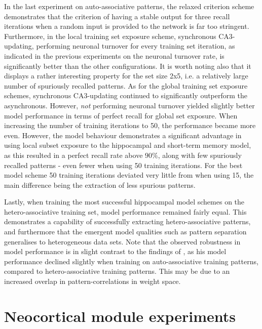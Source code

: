 In the last experiment on auto-associative patterns, the relaxed criterion scheme demonstrates that the criterion of having a stable output for three recall iterations when a random input is provided to the network is far too stringent. Furthermore, in the local training set exposure scheme, synchronous CA3-updating, performing neuronal turnover for every training set iteration, as indicated in the previous experiments on the neuronal turnover rate, is significantly better than the other configurations. It is worth noting also that it displays a rather interesting property for the set size 2x5, i.e. a relatively large number of spuriously recalled patterns. As for the global training set exposure schemes, synchronous CA3-updating continued to significantly outperform the asynchronous. However, \textit{not} performing neuronal turnover yielded slightly better model performance in terms of perfect recall for global set exposure. When increasing the number of training iterations to 50, the performance became more even. However, the model behaviour demonstrates a significant advantage in using local subset exposure to the hippocampal and short-term memory model, as this resulted in a perfect recall rate above $90 \%$, along with few spuriously recalled patterns - even fewer when using 50 training iterations. For the best model scheme 50 training iterations deviated very little from when using 15, the main difference being the extraction of less spurious patterns.

Lastly, when training the most successful hippocampal model schemes on the hetero-associative training set, model performance remained fairly equal. This demonstrates a capability of successfully extracting hetero-associative patterns, and furthermore that the emergent model qualities such as pattern separation generalises to heterogeneous data sets. Note that the observed robustness in model performance is in slight contrast to the findings of \citep{Hattori2014}, as his model performance declined slightly when training on auto-associative training patterns, compared to hetero-associative training patterns. This may be due to an increased overlap in pattern-correlations in weight space.




\section{Neocortical module experiments}

